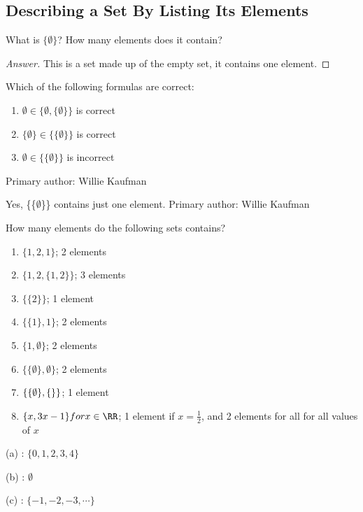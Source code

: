\subsection{Describing a Set By Listing Its Elements}%
				\begin{minorEx}%
					What is $ \{\emptyset\} $? How many elements does it contain?
				\end{minorEx}
				\begin{proof}[Answer]
					This is a set made up of the empty set, it contains one element.
				\end{proof}
				\begin{minorEx}%
                Which of the following formulas are correct:
				\begin{enumerate}
                \item $\emptyset \in \{\emptyset, \{\emptyset\}\}$ is correct
                \item $\{\emptyset\} \in \{\{\emptyset\}\}$ is correct
                \item $\emptyset \in \{\{\emptyset\}\}$ is incorrect
                \end{enumerate}
                Primary author: Willie Kaufman
				\end{minorEx}
				\begin{minorEx}%
					Yes, \{\{$\emptyset$\}\} contains just one element. \newline
                    Primary author: Willie Kaufman
				\end{minorEx}
				\begin{minorEx}%
					How many elements do the following sets contains?
				\end{minorEx}
                \begin{enumerate}
					\item $\{1,2,1 \}$; 2 elements
					\item $\{ 1,2,\{1,2\} \}$; 3 elements
					\item $\{\{ 2 \} \}$; 1 element
					\item $\{ \{1 \}, 1\}$; 2 elements
					\item $\{ 1, \emptyset \}$; 2 elements
					\item $\{ \{ \emptyset \}, \emptyset \}$; 2 elements
					\item $\{ \{ \emptyset\}, \{\null\} \}$; 1 element
					\item $\{x, 3x-1 \} for x\in \RR$; 1 element if $x = \frac{1}{2}$, and 2 elements for all for all values of $x$
                \end{enumerate}
                \begin{minorEx}
                (a) : $\{0, 1, 2, 3, 4\}$
                
                (b) : $\emptyset$
                
                (c) : $\{-1, -2, -3, \cdots\}$
                \end{minorEx}
